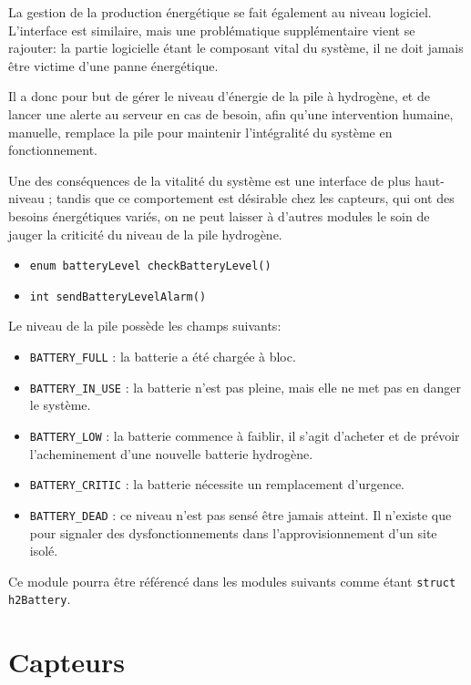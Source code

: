 La gestion de la production énergétique se fait également au niveau logiciel. L'interface est similaire, mais une problématique supplémentaire vient se rajouter: la partie logicielle étant le composant vital du système, il ne doit jamais être victime d'une panne énergétique.

Il a donc pour but de gérer le niveau d'énergie de la pile à hydrogène, et de lancer une alerte au serveur en cas de besoin, afin qu'une intervention humaine, manuelle, remplace la pile pour maintenir l'intégralité du système en fonctionnement.

Une des conséquences de la vitalité du système est une interface de plus haut-niveau ; tandis que ce comportement est désirable chez les capteurs, qui ont des besoins énergétiques variés, on ne peut laisser à d'autres modules le soin de jauger la criticité du niveau de la pile hydrogène.

\begin{itemize}
\item \tt{enum batteryLevel checkBatteryLevel()}
\item \tt{int sendBatteryLevelAlarm()}
\end{itemize}

Le niveau de la pile possède les champs suivants:

\begin{itemize}
\item \texttt{BATTERY\_FULL} : la batterie a été chargée à bloc.
\item \texttt{BATTERY\_IN\_USE} : la batterie n'est pas pleine, mais elle ne met pas en danger le système.
\item \texttt{BATTERY\_LOW} : la batterie commence à faiblir, il s'agit d'acheter et de prévoir l'acheminement d'une nouvelle batterie hydrogène.
\item \texttt{BATTERY\_CRITIC} : la batterie nécessite un remplacement d'urgence.
\item \texttt{BATTERY\_DEAD} : ce niveau n'est pas sensé être jamais atteint. Il n'existe que pour signaler des dysfonctionnements dans l'approvisionnement d'un site isolé.
\end{itemize}

Ce module pourra être référencé dans les modules suivants comme étant \texttt{struct h2Battery}.


\section{Capteurs}

